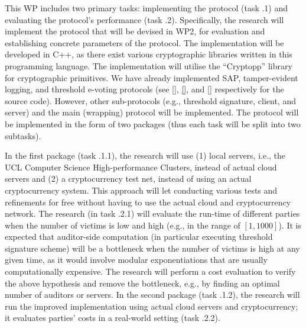  \vs
\noindent{}

\vs

This WP includes two primary tasks: implementing the protocol (task \3.1) and evaluating the protocol's performance (task \3.2). 
%
Specifically, the research will implement the protocol that will be devised in WP2, for evaluation and establishing concrete parameters of the protocol. The implementation will be developed in C++, as there exist various cryptographic libraries written in this programming language. The implementation will utilise the ``Cryptopp'' library for cryptographic primitives. 
%
We have already implemented SAP, tamper-evident logging, and threshold e-voting protocols (see \href{https://github.com/AydinAbadi/RC-S-P/blob/main/RC-PoR-P-Source-cod/RC-PoR-P-Smart-Contract.sol}{[\printcntr]}, \href{https://github.com/AydinAbadi/RC-S-P/blob/main/RC-PoR-P-Source-cod/RC-PoR-P.cpp}{[\printcntr]}, and \href{https://github.com/AydinAbadi/PwDR/blob/main/PwDR-code/generic-encoding-decoding.cpp}{[\printcntr]} respectively for the source code). However, other sub-protocols (e.g., threshold signature, client, and server) and the main (wrapping) protocol will be implemented. The protocol will be implemented in the form of two packages (thus each task will be split into two subtasks). 

In the first package (task \3.1.1), the research will use (1) local servers, i.e., the UCL Computer Science High-performance Clusters, instead of actual cloud servers and (2) a cryptocurrency test net, instead of using an actual cryptocurrency system. This approach will let conducting various tests and refinements for free without having to use the actual cloud and cryptocurrency network. The research (in task \3.2.1) will evaluate the run-time of different parties when the number of victims is low and high (e.g., in the range of $[1,1000]$). It is expected that auditor-side computation (in particular executing threshold signature scheme) will be a bottleneck when the number of victims is high at any given time, as it would involve modular exponentiations that are usually computationally expensive. The research will perform a cost evaluation to verify the above hypothesis and remove the bottleneck, e.g., by finding an optimal number of auditors or servers. %
%
 In the second package (task \3.1.2), the research will run the improved implementation using actual cloud servers and cryptocurrency; it evaluates parties' costs in a real-world setting (task \3.2.2). 




